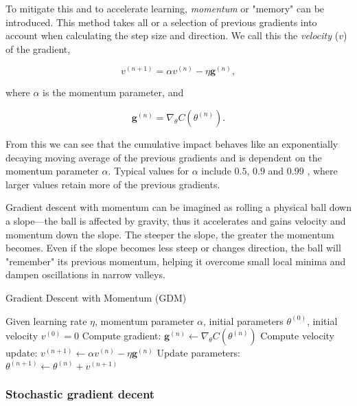 \documentclass[amssymb,twocolumn,aps]{revtex4}
\begin{document}
To mitigate this and to accelerate learning, \textit{momentum} or "memory" can be introduced. This method takes all or a selection of previous gradients into account when calculating the step size and direction. We call this the \textit{velocity} ($v$) of the gradient, 

$$v^{(n+1)} = \alpha v^{(n)} - \eta \boldsymbol{g}^{(n)},$$

where $\alpha$ is the momentum parameter, and

$$\boldsymbol{g}^{(n)} = \nabla_\theta C(\theta^{(n)}).$$

From this we can see that the cumulative impact behaves like an exponentially decaying moving average of the previous gradients and is dependent on the momentum parameter $\alpha$. Typical values for $\alpha$ include $0.5$, $0.9$ and $0.99$ \cite{Goodfellow-et-al-2016}, where larger values retain more of the previous gradients.

Gradient descent with momentum can be imagined as rolling a physical ball down a slope—the ball is affected by gravity, thus it accelerates and gains velocity and momentum down the slope. The steeper the slope, the greater the momentum becomes. Even if the slope becomes less steep or changes direction, the ball will "remember" its previous momentum, helping it overcome small local minima and dampen oscillations in narrow valleys.



\begin{algorithm}[H]
    \caption{Gradient Descent with Momentum (GDM)}
    \label{algorithm:GDM}
    \begin{algorithmic}[1]
        \State Given learning rate $\eta$, momentum parameter $\alpha$, initial parameters $\theta^{(0)}$, initial velocity $v^{(0)} = 0$
      \State Compute gradient: $\boldsymbol{g}^{(n)} \leftarrow \nabla_\theta C(\theta^{(n)})$
      \State Compute velocity update: $v^{(n+1)} \leftarrow \alpha v^{(n)} - \eta \boldsymbol{g}^{(n)}$
      \State Update parameters: $\theta^{(n+1)} \leftarrow \theta^{(n)} + v^{(n+1)}$
    \EndWhile
    \end{algorithmic}
\end{algorithm}



\subsubsection{Stochastic gradient decent} 
\end{document}
